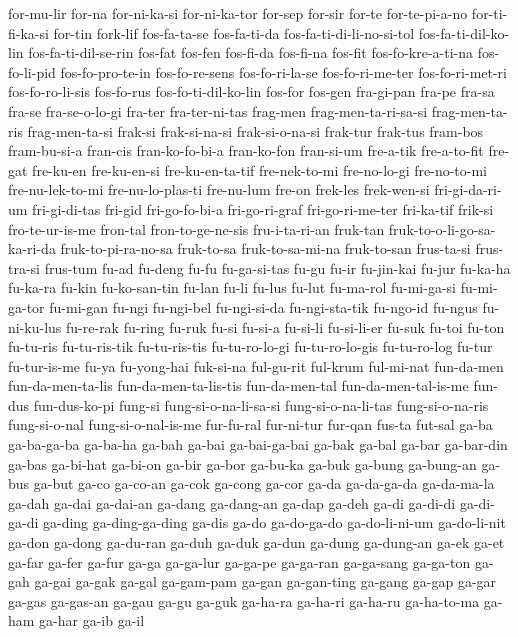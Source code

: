 {for-mu-lir for-na for-ni-ka-si for-ni-ka-tor for-sep for-sir for-te
for-te-pi-a-no for-ti-fi-ka-si for-tin fork-lif fos-fa-ta-se fos-fa-ti-da
fos-fa-ti-di-li-no-si-tol fos-fa-ti-dil-ko-lin fos-fa-ti-dil-se-rin
fos-fat fos-fen fos-fi-da fos-fi-na fos-fit fos-fo-kre-a-ti-na
fos-fo-li-pid fos-fo-pro-te-in fos-fo-re-sens fos-fo-ri-la-se
fos-fo-ri-me-ter fos-fo-ri-met-ri fos-fo-ro-li-sis fos-fo-rus
fos-fo-ti-dil-ko-lin fos-for fos-gen fra-gi-pan fra-pe fra-sa fra-se
fra-se-o-lo-gi fra-ter fra-ter-ni-tas frag-men frag-men-ta-ri-sa-si
frag-men-ta-ris frag-men-ta-si frak-si frak-si-na-si frak-si-o-na-si
frak-tur frak-tus fram-bos fram-bu-si-a fran-cis fran-ko-fo-bi-a
fran-ko-fon fran-si-um fre-a-tik fre-a-to-fit fre-gat fre-ku-en
fre-ku-en-si fre-ku-en-ta-tif fre-nek-to-mi fre-no-lo-gi fre-no-to-mi
fre-nu-lek-to-mi fre-nu-lo-plas-ti fre-nu-lum fre-on frek-les frek-wen-si
fri-gi-da-ri-um fri-gi-di-tas fri-gid fri-go-fo-bi-a fri-go-ri-graf
fri-go-ri-me-ter fri-ka-tif frik-si fro-te-ur-is-me fron-tal
fron-to-ge-ne-sis fru-i-ta-ri-an fruk-tan fruk-to-o-li-go-sa-ka-ri-da
fruk-to-pi-ra-no-sa fruk-to-sa fruk-to-sa-mi-na fruk-to-san frus-ta-si
frus-tra-si frus-tum fu-ad fu-deng fu-fu fu-ga-si-tas fu-gu fu-ir
fu-jin-kai fu-jur fu-ka-ha fu-ka-ra fu-kin fu-ko-san-tin fu-lan fu-li
fu-lus fu-lut fu-ma-rol fu-mi-ga-si fu-mi-ga-tor fu-mi-gan fu-ngi
fu-ngi-bel fu-ngi-si-da fu-ngi-sta-tik fu-ngo-id fu-ngus fu-ni-ku-lus
fu-re-rak fu-ring fu-ruk fu-si fu-si-a fu-si-li fu-si-li-er fu-suk fu-toi
fu-ton fu-tu-ris fu-tu-ris-tik fu-tu-ris-tis fu-tu-ro-lo-gi
fu-tu-ro-lo-gis fu-tu-ro-log fu-tur fu-tur-is-me fu-ya fu-yong-hai
fuk-si-na ful-gu-rit ful-krum ful-mi-nat fun-da-men fun-da-men-ta-lis
fun-da-men-ta-lis-tis fun-da-men-tal fun-da-men-tal-is-me fun-dus
fun-dus-ko-pi fung-si fung-si-o-na-li-sa-si fung-si-o-na-li-tas
fung-si-o-na-ris fung-si-o-nal fung-si-o-nal-is-me fur-fu-ral fur-ni-tur
fur-qan fus-ta fut-sal ga-ba ga-ba-ga-ba ga-ba-ha ga-bah ga-bai
ga-bai-ga-bai ga-bak ga-bal ga-bar ga-bar-din ga-bas ga-bi-hat ga-bi-on
ga-bir ga-bor ga-bu-ka ga-buk ga-bung ga-bung-an ga-bus ga-but ga-co
ga-co-an ga-cok ga-cong ga-cor ga-da ga-da-ga-da ga-da-ma-la ga-dah ga-dai
ga-dai-an ga-dang ga-dang-an ga-dap ga-deh ga-di ga-di-di ga-di-ga-di
ga-ding ga-ding-ga-ding ga-dis ga-do ga-do-ga-do ga-do-li-ni-um
ga-do-li-nit ga-don ga-dong ga-du-ran ga-duh ga-duk ga-dun ga-dung
ga-dung-an ga-ek ga-et ga-far ga-fer ga-fur ga-ga ga-ga-lur ga-ga-pe
ga-ga-ran ga-ga-sang ga-ga-ton ga-gah ga-gai ga-gak ga-gal ga-gam-pam
ga-gan ga-gan-ting ga-gang ga-gap ga-gar ga-gas ga-gas-an ga-gau ga-gu
ga-guk ga-ha-ra ga-ha-ri ga-ha-ru ga-ha-to-ma ga-ham ga-har ga-ib ga-il
}
